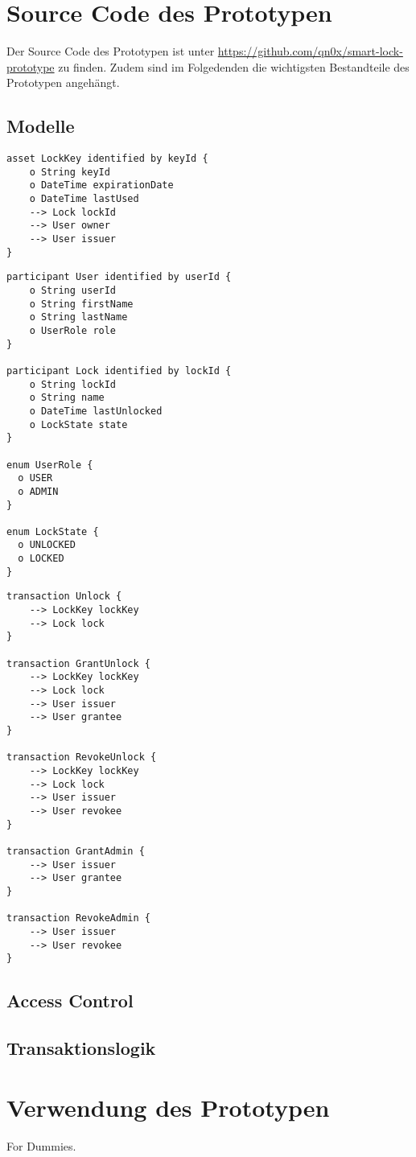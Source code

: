 \section{Source Code des Prototypen}
\label{apx:prototype}
    Der Source Code des Prototypen ist unter \sloppy\url{https://github.com/qn0x/smart-lock-prototype} zu finden. 
    Zudem sind im Folgedenden die wichtigsten Bestandteile des Prototypen angehängt.
    
    \subsection{Modelle}
        \begin{lstlisting}[caption={Assets},label=model_assets,captionpos=b]
asset LockKey identified by keyId {
    o String keyId
    o DateTime expirationDate
    o DateTime lastUsed
    --> Lock lockId
    --> User owner
    --> User issuer
}
        \end{lstlisting}
        \vspace{1em}
        \begin{lstlisting}[caption={Participants},label=model_participants,captionpos=b]
participant User identified by userId {
    o String userId
    o String firstName
    o String lastName
    o UserRole role
}

participant Lock identified by lockId {
    o String lockId
    o String name
    o DateTime lastUnlocked
    o LockState state
}

enum UserRole {
  o USER
  o ADMIN
}

enum LockState {
  o UNLOCKED
  o LOCKED
}
        \end{lstlisting}
        \vspace{1em}
        \begin{lstlisting}[caption={Transactions},label=model_transactopms,captionpos=b]
transaction Unlock {
    --> LockKey lockKey
    --> Lock lock
}

transaction GrantUnlock {
    --> LockKey lockKey
    --> Lock lock
    --> User issuer
    --> User grantee
}

transaction RevokeUnlock {
    --> LockKey lockKey
    --> Lock lock
    --> User issuer
    --> User revokee
}

transaction GrantAdmin {
    --> User issuer
    --> User grantee
}

transaction RevokeAdmin {
    --> User issuer
    --> User revokee
}
        \end{lstlisting}
    
    \subsection{Access Control}
    \subsection{Transaktionslogik}
\newpage
\section{Verwendung des Prototypen}
    For Dummies. 
